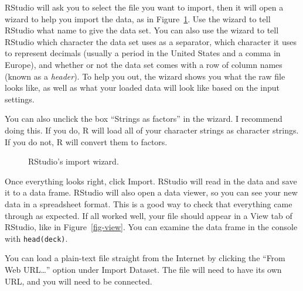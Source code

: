 \documentclass[
  letterpaper,
  DIV=11,
  numbers=noendperiod]{scrbook}
\makeatletter
\newcommand*\pandocbounded[1]{%
  \sbox\pandoc@box{#1}%
  \Gscale@div\@tempa{\textheight}{\dimexpr\ht\pandoc@box+\dp\pandoc@box\relax}%
  \Gscale@div\@tempb{\linewidth}{\wd\pandoc@box}%
  \ifdim\@tempb\p@<\@tempa\p@\let\@tempa\@tempb\fi%
  \ifdim\@tempa\p@<\p@\scalebox{\@tempa}{\usebox\pandoc@box}%
  \else\usebox{\pandoc@box}%
  \fi%
}
\makeatother
\begin{document}
RStudio will ask you to select the file you want to import, then it will
open a wizard to help you import the data, as in
Figure~\ref{fig-wizard}. Use the wizard to tell RStudio what name to
give the data set. You can also use the wizard to tell RStudio which
character the data set uses as a separator, which character it uses to
represent decimals (usually a period in the United States and a comma in
Europe), and whether or not the data set comes with a row of column
names (known as a \emph{header}). To help you out, the wizard shows you
what the raw file looks like, as well as what your loaded data will look
like based on the input settings.

You can also unclick the box ``Strings as factors'' in the wizard. I
recommend doing this. If you do, R will load all of your character
strings as character strings. If you do not, R will convert them to
factors.

\begin{figure}

\centering{

\pandocbounded{\texttt{[image: images/hopr\_0304.png]}}

}

\caption{\label{fig-wizard}RStudio's import wizard.}

\end{figure}%

Once everything looks right, click Import. RStudio will read in the data
and save it to a data frame. RStudio will also open a data viewer, so
you can see your new data in a spreadsheet format. This is a good way to
check that everything came through as expected. If all worked well, your
file should appear in a View tab of RStudio, like in
Figure~\ref{fig-view}. You can examine the data frame in the console
with \texttt{head(deck)}.

\begin{tcolorbox}[enhanced jigsaw, breakable, colback=white, colbacktitle=quarto-callout-tip-color!10!white, arc=.35mm, bottomrule=.15mm, coltitle=black, left=2mm, rightrule=.15mm, colframe=quarto-callout-tip-color-frame, leftrule=.75mm, opacitybacktitle=0.6, bottomtitle=1mm, toptitle=1mm, titlerule=0mm, opacityback=0, title=\textcolor{quarto-callout-tip-color}{\faLightbulb}\hspace{0.5em}{Online data}, toprule=.15mm]

You can load a plain-text file straight from the Internet by clicking
the ``From Web URL\ldots{}'' option under Import Dataset. The file will
need to have its own URL, and you will need to be connected.

\end{tcolorbox}
\end{document}
